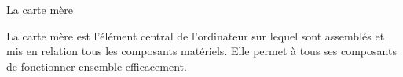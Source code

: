 \begin{frame}{La carte mère}
  \centerline{%
  }

  La carte mère est l'élément central de l'ordinateur sur lequel sont
  assemblés et mis en relation tous les composants matériels. Elle
  permet à tous ses composants de fonctionner ensemble efficacement.
\end{frame}


